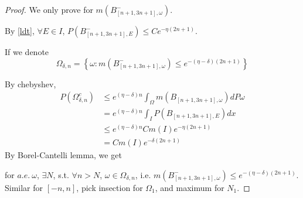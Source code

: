 \begin{proof}
  We only prove for $m(B_{[n+1,3n+1],\omega}^-)$.

  By \eqref{ldt}, $\forall E\in I$, $P(B_{[n+1,3n+1],E}^-)\leq Ce^{-\eta(2n+1)}$.

  If we denote
    \[
      \Omega_{\delta,n}=\left\{\omega:m(B_{[n+1,3n+1],\omega}^-)\leq e^{-(\eta-\delta)(2n+1)}\right\}
    \]

  By chebyshev,
  \[
    \begin{aligned}
      P(\Omega_{\delta,n}^c)
      &\leq e^{(\eta-\delta)n}\int_{\Omega} m(B_{[n+1,3n+1],\omega})dP\omega\\
      &=    e^{(\eta-\delta)n}\int_I P(B_{[n+1,3n+1],E})dx\\
      &\leq e^{(\eta-\delta)n}Cm(I)e^{-\eta(2n+1)}\\
      &=Cm(I)e^{-\delta(2n+1)}
    \end{aligned}
  \]
By Borel-Cantelli lemma, we get

for $a.e.~\omega$, $\exists N$, s.t. $\forall n>N$, $\omega\in\Omega_{\delta,n}$, i.e. $m(B_{[n+1,3n+1],\omega}^-)\leq e^{-(\eta-\delta)(2n+1)}.$
Similar for $[-n,n]$, pick insection for $\Omega_1$, and maximum for $N_1$.
\end{proof}

